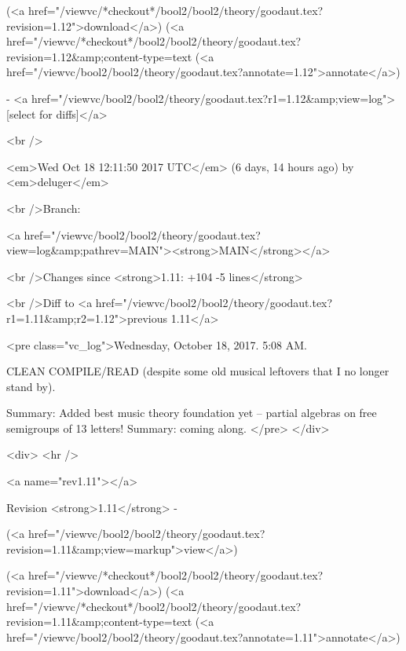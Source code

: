 (<a href="/viewvc/*checkout*/bool2/bool2/theory/goodaut.tex?revision=1.12">download</a>)
(<a href="/viewvc/*checkout*/bool2/bool2/theory/goodaut.tex?revision=1.12&amp;content-type=text%
(<a href="/viewvc/bool2/bool2/theory/goodaut.tex?annotate=1.12">annotate</a>)



- <a href="/viewvc/bool2/bool2/theory/goodaut.tex?r1=1.12&amp;view=log">[select for diffs]</a>




<br />

<em>Wed Oct 18 12:11:50 2017 UTC</em>
(6 days, 14 hours ago)
by <em>deluger</em>


<br />Branch:

<a href="/viewvc/bool2/bool2/theory/goodaut.tex?view=log&amp;pathrev=MAIN"><strong>MAIN</strong></a>







<br />Changes since <strong>1.11: +104 -5 lines</strong>








<br />Diff to <a href="/viewvc/bool2/bool2/theory/goodaut.tex?r1=1.11&amp;r2=1.12">previous 1.11</a>










<pre class="vc_log">Wednesday, October 18, 2017.  5:08 AM.

CLEAN COMPILE/READ (despite some old musical leftovers that I no longer
stand by).

Summary: Added best music theory foundation yet -- partial algebras on
free semigroups of 13 letters!
Summary: coming along.
</pre>
</div>



<div>
<hr />

<a name="rev1.11"></a>


Revision <strong>1.11</strong> -


(<a href="/viewvc/bool2/bool2/theory/goodaut.tex?revision=1.11&amp;view=markup">view</a>)


(<a href="/viewvc/*checkout*/bool2/bool2/theory/goodaut.tex?revision=1.11">download</a>)
(<a href="/viewvc/*checkout*/bool2/bool2/theory/goodaut.tex?revision=1.11&amp;content-type=text%
(<a href="/viewvc/bool2/bool2/theory/goodaut.tex?annotate=1.11">annotate</a>)



